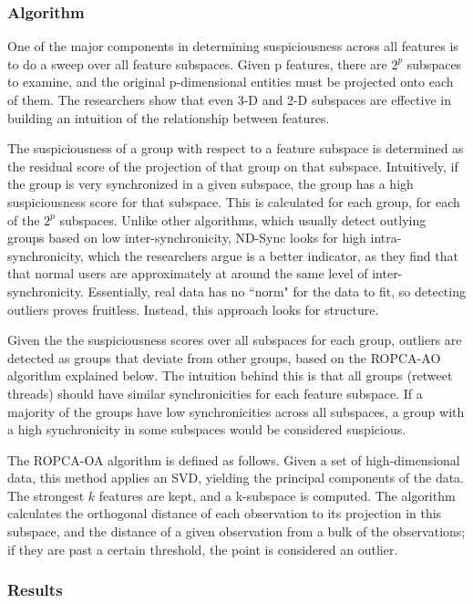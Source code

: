 \documentclass[11pt, oneside]{article}   	%
\begin{document}
\subsubsection*{Algorithm}

\quad One of the major components in determining suspiciousness across all features is to do a sweep over all feature subspaces.
Given p features, there are $2^p$ subspaces to examine, and the original p-dimensional entities must be projected onto each of them.
The researchers show that even 3-D and 2-D subspaces are effective in building an intuition of the relationship between features.

\quad The suspiciousness of a group with respect to a feature subspace is determined as the residual score of the projection of that group on that subspace.
Intuitively, if the group is very synchronized in a given subspace, the group has a high suspiciousness score for that subspace.
This is calculated for each group, for each of the $2^p$ subspaces.
Unlike other algorithms, which usually detect outlying groups based on low inter-synchronicity, ND-Sync looks for high intra-synchronicity, which the researchers argue is a better indicator, as they find that that normal users are approximately at around the same level of inter-synchronicity.
Essentially, real data has no ``norm" for the data to fit, so detecting outliers proves fruitless.
Instead, this approach looks for structure.

\quad Given the the suspiciousness scores over all subspaces for each group, outliers are detected as groups that deviate from other groups, based on the ROPCA-AO algorithm explained below.
The intuition behind this is that all groups (retweet threads) should have similar synchronicities for each feature subspace.
If a majority of the groups have low synchronicities across all subspaces, a group with a high synchronicity in some subspaces would be considered suspicious.

\quad The ROPCA-OA algorithm is defined as follows.
Given a set of high-dimensional data, this method applies an SVD, yielding the principal components of the data.
The strongest $k$ features are kept, and a k-subspace is computed.
The algorithm calculates the orthogonal distance of each observation to its projection in this subspace, and the distance of a given observation from a bulk of the observations; if they are past a certain threshold, the point is considered an outlier.

\subsubsection*{Results}
\end{document}
